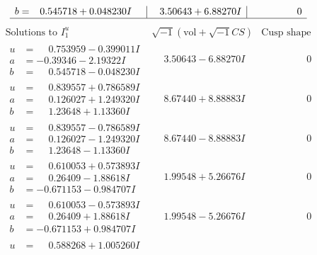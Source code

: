 \documentclass[1p]{elsarticle_modified}
\theoremstyle{definition}
\newcommand{\I}{\sqrt{-1}}
\begin{document}
$$\begin{array}{c|c|c}
\begin{aligned}
b &= \phantom{-}0.545718 + 0.048230 I\end{aligned}
 & \phantom{-}3.50643 + 6.88270 I & \phantom{-0.000000 } 0\\
 \hline 
 \end{array}$$\newpage$$\begin{array}{c|c|c}  
\text{Solutions to }I^u_{1}& \I (\text{vol} + \sqrt{-1}CS) & \text{Cusp shape}\\
 \hline 
\begin{aligned}
u &= \phantom{-}0.753959 - 0.399011 I \\
a &= -0.39346 - 2.19322 I \\
b &= \phantom{-}0.545718 - 0.048230 I\end{aligned}
 & \phantom{-}3.50643 - 6.88270 I & \phantom{-0.000000 } 0 \\ \hline\begin{aligned}
u &= \phantom{-}0.839557 + 0.786589 I \\
a &= \phantom{-}0.126027 + 1.249320 I \\
b &= \phantom{-}1.23648 + 1.13360 I\end{aligned}
 & \phantom{-}8.67440 + 8.88883 I & \phantom{-0.000000 } 0 \\ \hline\begin{aligned}
u &= \phantom{-}0.839557 - 0.786589 I \\
a &= \phantom{-}0.126027 - 1.249320 I \\
b &= \phantom{-}1.23648 - 1.13360 I\end{aligned}
 & \phantom{-}8.67440 - 8.88883 I & \phantom{-0.000000 } 0 \\ \hline\begin{aligned}
u &= \phantom{-}0.610053 + 0.573893 I \\
a &= \phantom{-}0.26409 - 1.88618 I \\
b &= -0.671153 - 0.984707 I\end{aligned}
 & \phantom{-}1.99548 + 5.26676 I & \phantom{-0.000000 } 0 \\ \hline\begin{aligned}
u &= \phantom{-}0.610053 - 0.573893 I \\
a &= \phantom{-}0.26409 + 1.88618 I \\
b &= -0.671153 + 0.984707 I\end{aligned}
 & \phantom{-}1.99548 - 5.26676 I & \phantom{-0.000000 } 0 \\ \hline\begin{aligned}
u &= \phantom{-}0.588268 + 1.005260 I \\

\end{aligned}
\end{array}$$
\end{document}
